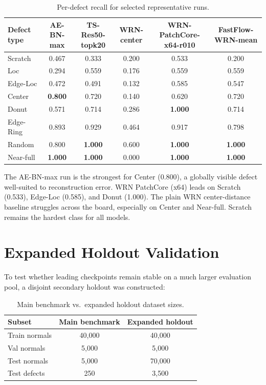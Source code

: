 \documentclass[11pt]{article}
\begin{document}
\begin{table}[H]
\centering
\caption{Per-defect recall for selected representative runs.}
\label{tab:per_defect}
\begin{tabular}{lccccc}
\toprule
Defect type
  & AE-BN-max
  & TS-Res50-topk20
  & WRN-center
  & WRN-PatchCore-x64-r010
  & FastFlow-WRN-mean \\
\midrule
Scratch   & 0.467 & 0.333 & 0.200 & 0.533 & 0.200 \\
Loc       & 0.294 & 0.559 & 0.176 & 0.559 & 0.559 \\
Edge-Loc  & 0.472 & 0.491 & 0.132 & 0.585 & 0.547 \\
Center    & \textbf{0.800} & 0.720 & 0.140 & 0.620 & 0.720 \\
Donut     & 0.571 & 0.714 & 0.286 & \textbf{1.000} & 0.714 \\
Edge-Ring & 0.893 & 0.929 & 0.464 & 0.917 & 0.798 \\
Random    & 0.800 & \textbf{1.000} & 0.600 & \textbf{1.000} & \textbf{1.000} \\
Near-full & \textbf{1.000} & \textbf{1.000} & 0.000 & \textbf{1.000} & \textbf{1.000} \\
\bottomrule
\end{tabular}
\end{table}

The AE-BN-max run is the strongest for Center (0.800), a globally visible
defect well-suited to reconstruction error.  WRN PatchCore (x64) leads on
Scratch (0.533), Edge-Loc (0.585), and Donut (1.000).  The plain WRN
center-distance baseline struggles across the board, especially on Center
and Near-full.  Scratch remains the hardest class for all models.

\section{Expanded Holdout Validation}

To test whether leading checkpoints remain stable on a much larger evaluation
pool, a disjoint secondary holdout was constructed:

\begin{table}[H]
\centering
\caption{Main benchmark vs.\ expanded holdout dataset sizes.}
\label{tab:holdout_sizes}
\begin{tabular}{lcc}
\toprule
Subset & Main benchmark & Expanded holdout \\
\midrule
Train normals & 40{,}000 & 40{,}000 \\
Val normals   &  5{,}000 &  5{,}000 \\
Test normals  &  5{,}000 & 70{,}000 \\
Test defects  &    250   &  3{,}500 \\
\bottomrule
\end{tabular}
\end{table}
\end{document}
